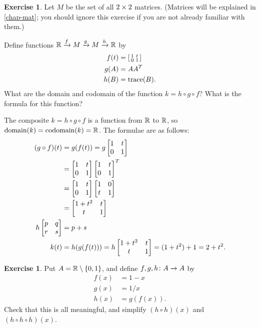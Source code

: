 \documentclass[a4paper]{book}
\theoremstyle{definition}
\newtheorem{exercise}[theorem]{Exercise}
\renewenvironment{solution}{\SolutionInline}{\endSolutionInline}
\begin{document}
\begin{exercise}
 Let $M$ be the set of all $2\times 2$ matrices.  (Matrices will be
 explained in \autoref{chap-mat}; you should ignore this exercise if
 you are not already familiar with them.)

 Define functions ${\mathbb{R}}\xrightarrow{f}M\xrightarrow{g}M\xrightarrow{h}{\mathbb{R}}$ by 
 \begin{align*}
  f(t) &= \left[\begin{smallmatrix} 1 & t \\ 0 & 1 \end{smallmatrix}\right] \\
  g(A) &= AA^T \\
  h(B) &= \operatorname{trace}(B).
 \end{align*}
 What are the domain and codomain of the function $k=h\circ g\circ f$?
 What is the formula for this function?
\end{exercise}
\begin{solution}
 The composite $k=h\circ g\circ f$ is a function from ${\mathbb{R}}$ to ${\mathbb{R}}$, so
 $\text{domain}(k)=\text{codomain}(k)={\mathbb{R}}$.  The formulae are as
 follows: 
 \begin{align*}
  (g\circ f)(t) &= g(f(t)) = g\begin{bmatrix} 1 & t \\ 0 & 1\end{bmatrix} \\
    &= \begin{bmatrix} 1 & t \\ 0 & 1 \end{bmatrix} \begin{bmatrix} 1 & t \\ 0 & 1 \end{bmatrix}^T \\
    &= \begin{bmatrix} 1 & t \\ 0 & 1 \end{bmatrix} \begin{bmatrix} 1 & 0 \\ t & 1 \end{bmatrix} \\
    &= \begin{bmatrix} 1+t^2 & t \\ t & 1 \end{bmatrix} \\
  h\begin{bmatrix} p & q \\ r & s \end{bmatrix} &= p+s \\
  k(t) &= h(g(f(t))) = h\begin{bmatrix} 1+t^2 & t \\ t & 1 \end{bmatrix} 
        = (1+t^2)+1 = 2+t^2.
 \end{align*}
\end{solution}
\begin{exercise}
 Put $A={\mathbb{R}}\setminus\{0,1\}$, and define $f,g,h\colon A\xrightarrow{}A$ by 
 \begin{align*}
  f(x) &= 1-x \\
  g(x) &= 1/x \\
  h(x) &= g(f(x)).
 \end{align*}
 Check that this is all meaningful, and simplify
 $(h\circ h)(x)$ and $(h\circ h\circ h)(x)$.
\end{exercise}
\end{document}
